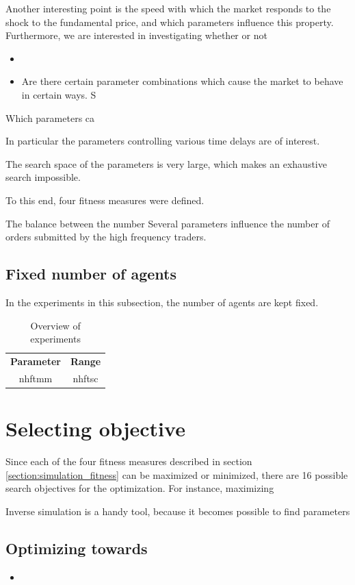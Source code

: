 Another interesting point is the speed with which the market responds to the shock to the fundamental price, and which parameters influence this property. Furthermore, we are interested in investigating whether or not 

\begin{itemize}
\item 
\item Are there certain parameter combinations which cause the market to behave in certain ways. S
\end{itemize}
\item Which parameters ca



In particular the parameters controlling various time delays are of interest. 

The search space of the parameters is very large, which makes an exhaustive search impossible.





To this end, four fitness measures were defined.

The balance between the number 
Several parameters influence the number of orders submitted by the high frequency traders.

\subsection{Fixed number of agents}
In the experiments in this subsection, the number of agents are kept fixed. 

\begin{table}
\begin{tabular}{c|c}
\textbf{Parameter} & \textbf{Range}\\
nhftmm & 
nhftsc & 

\end{tabular}
\caption{Overview of experiments}
\end{table}


\section{Selecting objective}
Since each of the four fitness measures described in section \ref{section:simulation_fitness} can be maximized or minimized, there are 16 possible search objectives for the optimization. For instance, maximizing 


Inverse simulation is a handy tool, because it becomes possible to find parameters 

\subsection{Optimizing towards }


\begin{itemize}
\item 
\end{itemize}


